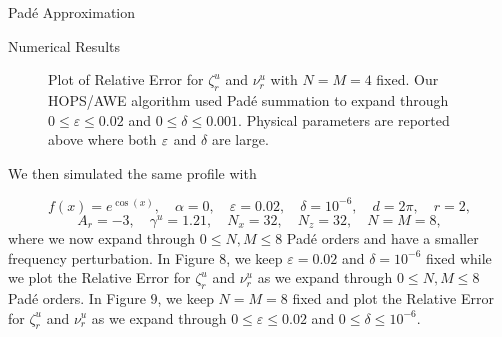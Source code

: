 \begin{section}{Pad\'e Approximation}
\begin{section}{Numerical Results}
\vspace{-40mm}
\begin{figure}[H]
\centering
\vspace{3mm}
\caption{Plot of Relative Error for $\zeta^u_r$ and $\nu^u_r$ with $N=M=4$ fixed. Our HOPS/AWE algorithm used Padé summation to expand through $0 \leq \varepsilon \leq 0.02$ and $0 \leq \delta \leq 0.001$. Physical parameters are reported above where both $\varepsilon$ and $\delta$ are large.}
\end{figure}
\vspace{-19mm}
\begin{flushleft}
We then simulated the same profile with
\end{flushleft}
$$f(x)=e^{\cos(x)},\quad \alpha = 0, \quad \varepsilon = 0.02, \quad \delta = 10^{-6}, \quad d=2\pi,\quad r=2,$$
$$A_r=-3,\quad \gamma^u = 1.21, \quad N_x = 32,\quad N_z=32, \quad N=M=8,$$
where we now expand through $0\leq N,M \leq 8$ Padé orders and have a smaller frequency perturbation. In Figure $8$, we keep $\varepsilon = 0.02$ and $\delta = 10^{-6}$ fixed while we plot the Relative Error for $\zeta^u_r$ and $\nu^u_r$ as we expand through $0 \leq N,M \leq 8$ Padé orders. In Figure $9$, we keep $N=M=8$ fixed and plot the Relative Error for $\zeta^u_r$ and $\nu^u_r$ as we expand through $0\leq \varepsilon \leq 0.02$ and $0 \leq \delta \leq 10^{-6}$.


\end{section}
\end{section}
